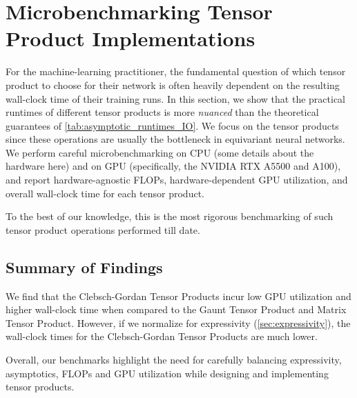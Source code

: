 \documentclass{article}
\theoremstyle{definition}
\theoremstyle{remark}
\begin{document}
\section{Microbenchmarking Tensor Product Implementations}
\label{sec:benchmarking}

For the machine-learning practitioner, the fundamental question of which tensor product to choose for their network is often heavily dependent on the resulting wall-clock time of their training runs. In this section, we show that the practical runtimes of different tensor products is more \emph{nuanced} than the theoretical guarantees of \autoref{tab:asymptotic_runtimes_IO}. We focus on the tensor products since these operations are usually the bottleneck in equivariant neural networks.
We perform careful microbenchmarking on CPU (some details about the hardware here) and on GPU (specifically, the NVIDIA RTX A5500 and A100), and report hardware-agnostic FLOPs, hardware-dependent GPU utilization, and overall wall-clock time for each tensor product. 

To the best of our knowledge, this is the most rigorous benchmarking of such tensor product operations performed till date.



\subsection{Summary of Findings}

We find that the Clebsch-Gordan Tensor Products incur low GPU utilization and higher wall-clock time when compared to the Gaunt Tensor Product and Matrix Tensor Product. However, if we normalize for expressivity  (\autoref{sec:expressivity}), the wall-clock times for the 
Clebsch-Gordan Tensor Products are much lower. 



Overall, our benchmarks highlight the need for carefully balancing expressivity, asymptotics, FLOPs and GPU utilization while designing and implementing tensor products.
\end{document}

